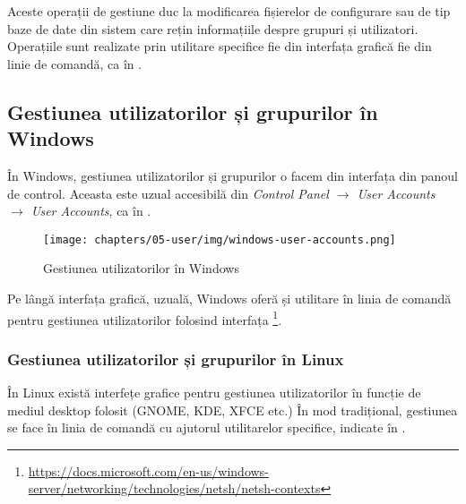 Aceste operații de gestiune duc la modificarea fișierelor de configurare sau de
tip baze de date din sistem care rețin informațiile despre grupuri și
utilizatori. Operațiile sunt realizate prin utilitare specifice fie din
interfața grafică fie din linie de comandă, ca în .

\subsection{Gestiunea utilizatorilor și grupurilor în Windows}
În Windows, gestiunea utilizatorilor și grupurilor o facem din interfața din
panoul de control. Aceasta este uzual accesibilă din \textit{Control Panel $\rightarrow$ User Accounts $\rightarrow$ User Accounts}, ca în .

\begin{figure}[!htbp]
	\centering
        \texttt{[image: chapters/05-user/img/windows-user-accounts.png]}
        \caption{Gestiunea utilizatorilor în Windows}
        \label{fig:user:windows-users}
\end{figure}

Pe lângă interfața grafică, uzuală, Windows oferă și utilitare în linia de
comandă pentru gestiunea utilizatorilor folosind interfața \footnote{\url{https://docs.microsoft.com/en-us/windows-server/networking/technologies/netsh/netsh-contexts}}.

\subsubsection{Gestiunea utilizatorilor și grupurilor în Linux}
\label{sec:user:user-group-linux}

În Linux există interfețe grafice pentru gestiunea utilizatorilor în funcție de
mediul desktop folosit (GNOME, KDE, XFCE etc.) În mod tradițional, gestiunea se
face în linia de comandă cu ajutorul utilitarelor specifice, indicate în .

